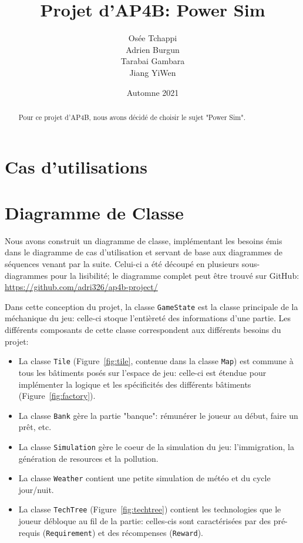 \documentclass[12pt]{article}
\title{Projet d'AP4B: Power Sim}
\author{
    Osée Tchappi \\
    Adrien Burgun \\
    Tarabai Gambara \\
    Jiang YiWen
}
\date{Automne 2021}
\begin{document}
\maketitle

\begin{abstract}
    Pour ce projet d'AP4B, nous avons décidé de choisir le sujet "Power Sim".
\end{abstract}

\newpage
\tableofcontents
\newpage

\section{Cas d'utilisations}

\section{Diagramme de Classe}

Nous avons construit un diagramme de classe, implémentant les besoins émis dans le diagramme de cas d'utilisation et servant de base aux diagrammes de séquences venant par la suite.
Celui-ci a été découpé en plusieurs sous-diagrammes pour la lisibilité; le diagramme complet peut être trouvé sur GitHub: \url{https://github.com/adri326/ap4b-project/}

Dans cette conception du projet, la classe \texttt{GameState} est la classe principale de la méchanique du jeu: celle-ci stoque l'entièreté des informations d'une partie.
Les différents composants de cette classe correspondent aux différents besoins du projet:

\begin{itemize}
\item La classe \texttt{Tile} (Figure~\ref{fig:tile}, contenue dans la classe \texttt{Map}) est commune à tous les bâtiments posés sur l'espace de jeu: celle-ci est étendue pour implémenter la logique et les spécificités des différents bâtiments (Figure~\ref{fig:factory}).
\item La classe \texttt{Bank} gère la partie "banque": rémunérer le joueur au début, faire un prêt, etc.
\item La classe \texttt{Simulation} gère le coeur de la simulation du jeu: l'immigration, la génération de resources et la pollution.
\item La classe \texttt{Weather} contient une petite simulation de météo et du cycle jour/nuit.
\item La classe \texttt{TechTree} (Figure~\ref{fig:techtree}) contient les technologies que le joueur débloque au fil de la partie: celles-cis sont caractérisées par des pré-requis (\texttt{Requirement}) et des récompenses (\texttt{Reward}).
\end{itemize}
\end{document}
